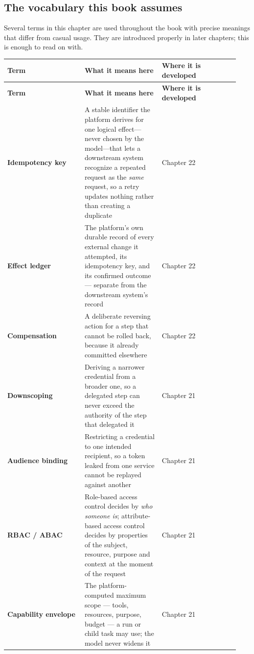 \subsection{The vocabulary this book assumes}

Several terms in this chapter are used throughout the book with precise meanings that differ from casual usage. They are introduced properly in later chapters; this is enough to read on with.\par

\BookTableStart
\small
\begin{longtable}{@{}Y{0.3133\linewidth}Y{0.3133\linewidth}Y{0.3133\linewidth}@{}}
\color{white}\bfseries Term & \color{white}\bfseries What it means here & \color{white}\bfseries Where it is developed \\
\endfirsthead
{}
\color{white}\bfseries Term & \color{white}\bfseries What it means here & \color{white}\bfseries Where it is developed \\
\endhead
\textbf{Idempotency key} & A stable identifier the platform derives for one logical effect—never chosen by the model—that lets a downstream system recognize a repeated request as the \emph{same} request, so a retry updates nothing rather than creating a duplicate & Chapter 22 \\
\textbf{Effect ledger} & The platform's own durable record of every external change it attempted, its idempotency key, and its confirmed outcome — separate from the downstream system's record & Chapter 22 \\
\textbf{Compensation} & A deliberate reversing action for a step that cannot be rolled back, because it already committed elsewhere & Chapter 22 \\
\textbf{Downscoping} & Deriving a narrower credential from a broader one, so a delegated step can never exceed the authority of the step that delegated it & Chapter 21 \\
\textbf{Audience binding} & Restricting a credential to one intended recipient, so a token leaked from one service cannot be replayed against another & Chapter 21 \\
\textbf{RBAC / ABAC} & Role-based access control decides by \emph{who someone is}; attribute-based access control decides by properties of the subject, resource, purpose and context at the moment of the request & Chapter 21 \\
\textbf{Capability envelope} & The platform-computed maximum scope — tools, resources, purpose, budget — a run or child task may use; the model never widens it & Chapter 21 \\

\end{longtable}
